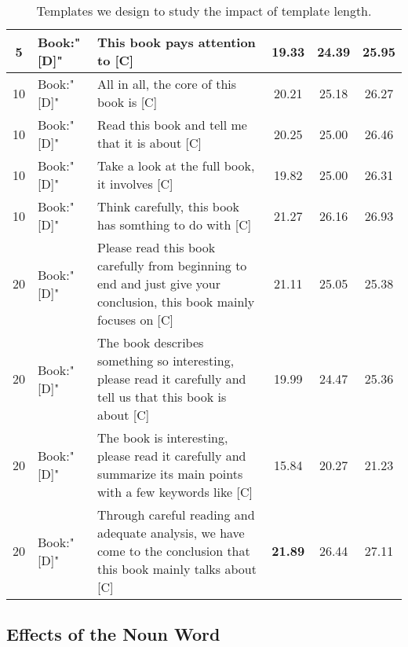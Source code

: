 \documentclass[11pt]{article}
\begin{document}
\begin{table*}[b]
{\begin{tabular}{clp{10cm}ccc}
5                       & Book:"[D]"               & This book pays attention to [C]                                                                                      & 19.33 & 24.39 & 25.95     \\
\midrule
10                      & Book:"[D]"               & All in all, the core of this book is [C]                                                                             & 20.21 & 25.18 & 26.27     \\
10                      & Book:"[D]"               & Read this book and tell me that it is about [C]                                                                      & 20.25 & 25.00 & 26.46     \\
10                      & Book:"[D]"               & Take a look at the full book, it involves [C]                                                                        & 19.82 & 25.00 & 26.31     \\
10                      & Book:"[D]"               & Think carefully, this book has somthing to do with [C]                                                               & 21.27 & 26.16 & 26.93     \\
\midrule
20                      & Book:"[D]"               & Please read this book carefully from beginning to end and just give your conclusion, this book mainly focuses on [C] & 21.11 & 25.05 & 25.38     \\
20                      & Book:"[D]"               & The book describes something so interesting, please read it carefully and tell us that this book is about [C]        & 19.99 & 24.47 & 25.36     \\
20                      & Book:"[D]"               & The book is interesting, please read it carefully and summarize its main points with a few keywords like [C]         & 15.84 & 20.27 & 21.23     \\
20                      & Book:"[D]"               & Through careful reading and adequate analysis, we have come to the conclusion that this book mainly talks about [C]  & \textbf{21.89} & 26.44 & 27.11     \\

\bottomrule
\end{tabular}}
\caption{Templates we design to study the impact of template length.}
\label{tb: templates}
\end{table*}

\subsection{Effects of the Noun Word}
\end{document}
